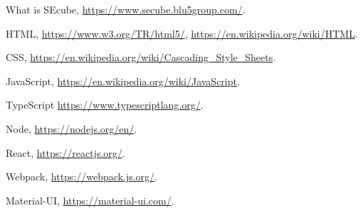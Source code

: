 \begin{thebibliography}{9}

What is SEcube, \url{https://www.secube.blu5group.com/}.
    
 HTML, \url{https://www.w3.org/TR/html5/}, \url{https://en.wikipedia.org/wiki/HTML}.

 CSS, \url{https://en.wikipedia.org/wiki/Cascading_Style_Sheets}.

 JavaScript, \url{https://en.wikipedia.org/wiki/JavaScript}.

 TypeScript \url{https://www.typescriptlang.org/}.

 Node, \url{https://nodejs.org/en/}.

 React, \url{https://reactjs.org/}.

 Webpack, \url{https://webpack.js.org/}.

 Material-UI, \url{https://material-ui.com/}.


\end{thebibliography}